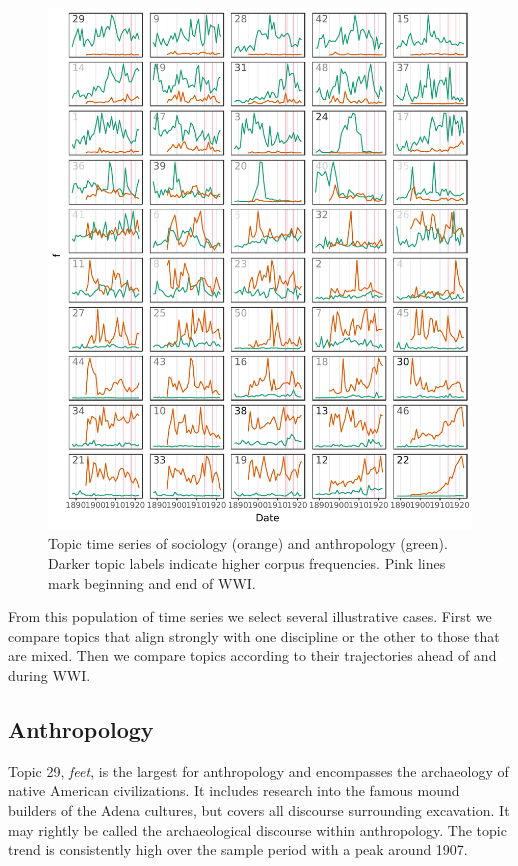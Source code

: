 \documentclass[]{book}
\theoremstyle{definition}
\theoremstyle{definition}
\theoremstyle{definition}
\theoremstyle{remark}
\begin{document}
\begin{figure}

{\centering \includegraphics[width=0.9\linewidth,height=1\textheight]{04_files/figure-latex/kts-1} 

}

\caption{Topic time series of sociology (orange) and anthropology (green). Darker topic labels indicate higher corpus frequencies. Pink lines mark beginning and end of WWI.}\label{fig:kts}
\end{figure}

From this population of time series we select several illustrative
cases. First we compare topics that align strongly with one discipline
or the other to those that are mixed. Then we compare topics according
to their trajectories ahead of and during WWI.

\hypertarget{anthropology}{%
\subsection{Anthropology}\label{anthropology}}

Topic 29, \emph{feet}, is the largest for anthropology and encompasses
the archaeology of native American civilizations. It includes research
into the famous mound builders of the Adena cultures, but covers all
discourse surrounding excavation. It may rightly be called the
archaeological discourse within anthropology. The topic trend is
consistently high over the sample period with a peak around 1907.
\end{document}
